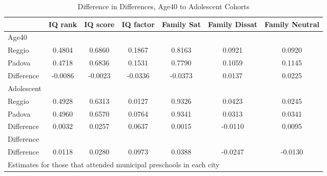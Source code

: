 \begin{table}[htbp]\centering
\caption{Difference in Differences, Age40 to Adolescent Cohorts}
\begin{tabular}{l*{6}{c}}
\hline\hline
            &     IQ rank&    IQ score&   IQ factor&  Family Sat&Family Dissat&Family Neutral\\
\hline
Age40       &            &            &            &            &            &            \\
Reggio      &      0.4804&      0.6860&      0.1867&      0.8163&      0.0921&      0.0920\\
Padova      &      0.4718&      0.6836&      0.1531&      0.7790&      0.1059&      0.1145\\
Difference  &     -0.0086&     -0.0023&     -0.0336&     -0.0373&      0.0137&      0.0225\\
\hline
Adolescent  &            &            &            &            &            &            \\
Reggio      &      0.4928&      0.6313&      0.0127&      0.9326&      0.0423&      0.0245\\
Padova      &      0.4960&      0.6570&      0.0764&      0.9341&      0.0313&      0.0341\\
Difference  &      0.0032&      0.0257&      0.0637&      0.0015&     -0.0110&      0.0095\\
\hline
Difference  &            &            &            &            &            &            \\
Difference  &      0.0118&      0.0280&      0.0973&      0.0388&     -0.0247&     -0.0130\\
\hline\hline
\multicolumn{7}{l}{\footnotesize Estimates for those that attended municipal preschools in each city}\\
\end{tabular}
\end{table}
